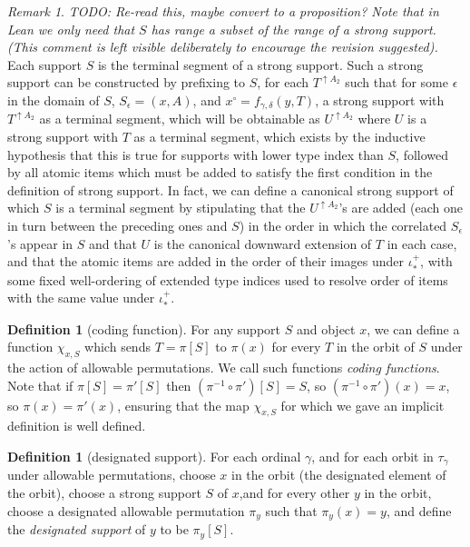 \documentclass[112pt]{article}
\theoremstyle{definition}
\newtheorem{definition}[theorem]{Definition}
\theoremstyle{remark}
\newtheorem{remark}[theorem]{Remark}
\newcommand{\rk}[1]{{\color{blue}\sl #1}}
\newcommand{\rk}[1]{}
\begin{document}
\begin{remark}\label{rk:canonical_strong_support}
\rk{TODO: Re-read this, maybe convert to a proposition? Note that in Lean we only need that $S$ has range a subset of the range of a strong support. (This comment is left visible deliberately to encourage the revision suggested).}
Each support $S$ is the terminal segment of a strong support.  Such a strong support can be constructed by prefixing to $S$, for each $T^{\uparrow A_2}$ such that for some $\epsilon$ in the domain of $S$, $S_\epsilon = (x,A)$, and $x^\circ = f_{\gamma,\delta}(y,T)$, a strong support with $T^{\uparrow A_2}$ as a terminal segment, which will be obtainable as $U^{\uparrow A_2}$ where $U$ is a strong support with $T$ as a terminal segment, which exists by the inductive hypothesis that this is true for supports with lower type index than $S$, followed by all atomic items which must be added to satisfy the first condition in the definition of strong support.   In fact, we can define a canonical strong support of which $S$ is a terminal segment by stipulating that the $U^{\uparrow A_2}$'s are added (each one in turn between the preceding ones and $S$)  in the order in which the correlated
$S_\epsilon$'s appear in $S$ and that $U$ is the canonical downward extension of $T$ in each case, and that the atomic items are added in the order of their images under $\iota^+_*$, with some fixed well-ordering of extended type indices used to resolve order of items with the same value under $\iota^+_*$.
\end{remark}

\begin{definition}[coding function]\label{def:coding_function}
For any support $S$ and object $x$, we can define a function $\chi_{x,S}$ which sends $T=\pi[S]$ to $\pi(x)$ for every $T$ in the orbit of $S$ under
the action of allowable permutations.  We call such functions {\em coding functions\/}.  Note that if $\pi[S]=\pi'[S]$ then $(\pi^{-1}\circ \pi')[S]= S$, so
$(\pi^{-1}\circ \pi')(x)= x$, so $\pi(x)=\pi'(x)$, ensuring that the map $\chi_{x,S}$ for which we gave an implicit definition is well defined.
\end{definition}

\begin{definition}[designated support]
For each ordinal $\gamma$, and for each orbit in $\tau_\gamma$ under allowable permutations, choose $x$ in the orbit (the designated element of the orbit), choose a strong support $S$ of $x$,and for every other $y$ in the orbit, choose a designated allowable permutation $\pi_y$ such that $\pi_y(x) = y$, and define the {\em designated support\/} of $y$ to be $\pi_y[S]$.
\end{definition}
\end{document}
